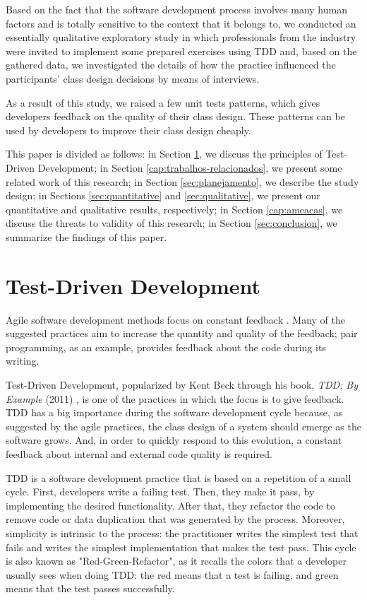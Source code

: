 \documentclass[times]{elsarticle}
\begin{document}
Based on the fact that the software development process involves many
human factors and is totally sensitive to the context that it belongs to,
we conducted an essentially qualitative exploratory study in which professionals
from the industry were invited to implement some prepared exercises using TDD and,
based on the gathered data, we investigated the details of how the practice influenced
the participants' class design decisions by means of interviews.

As a result of this study, we raised a few unit tests patterns, which gives developers
feedback on the quality of their class design. These patterns can be used by developers
to improve their class design cheaply.

This paper is divided as follows: in Section \ref{sec:tdd}, we discuss the principles
of Test-Driven Development; in Section \ref{cap:trabalhos-relacionados}, we present
some related work of this research; in Section \ref{sec:planejamento}, we describe the
study design; in Sections \ref{sec:quantitative} and \ref{sec:qualitative}, we present
our quantitative and qualitative results, respectively; in Section \ref{cap:ameacas},
we discuss the threats to validity of this research; in Section \ref{sec:conclusion},
we summarize the findings of this paper.


\section{Test-Driven Development}
\label{sec:tdd}

Agile software development methods focus on constant feedback \cite{AgileManifesto}. 
Many of the suggested practices
aim to increase the quantity and quality of the feedback; pair programming,
as an example, provides feedback about the code during its writing.

Test-Driven Development, popularized by Kent Beck through his book, \textit{TDD: By Example} (2011)
\cite{TDDByExample}, is one of the practices in which the focus is to give feedback. TDD has
a big importance during the software development cycle because, as suggested by the agile
practices, the class design of a system should emerge as the software grows. And, in order
to quickly respond to this evolution, a constant feedback about internal and external code
quality is required.

TDD is a software development practice that is based on a repetition of a small
cycle. First, developers write a failing test. Then, they make it pass,
by implementing the desired functionality. After that, they refactor the code
to remove code or data duplication that was generated by the process. Moreover,
simplicity is intrinsic to the process: the practitioner writes the simplest
test that fails and writes the simplest implementation that makes the
test pass. This cycle is also known as "Red-Green-Refactor", as it recalls the
colors that a developer usually sees when doing TDD: the red means that a test
is failing, and green means that the test passes successfully.
\end{document}
